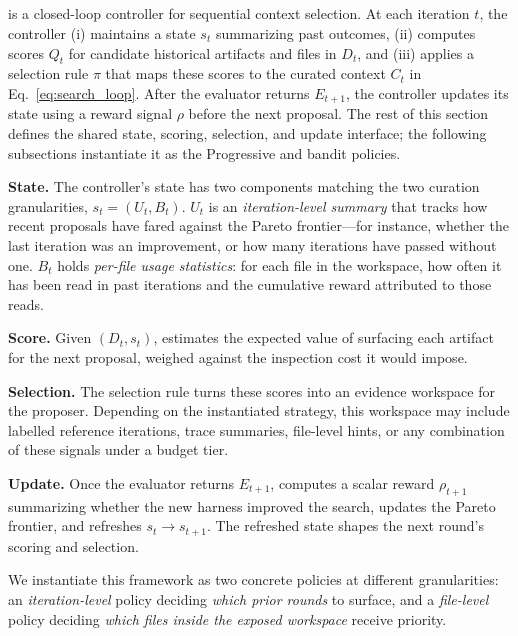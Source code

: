 \subsection{\name}
\name is a closed-loop controller for sequential context selection. At each iteration $t$, the controller (i) maintains a state $s_t$ summarizing past outcomes, (ii) computes scores $Q_t$ for candidate historical artifacts and files in $D_t$, and (iii) applies a selection rule $\pi$ that maps these scores to the curated context $C_t$ in Eq.~\ref{eq:search_loop}. After the evaluator returns $E_{t+1}$, the controller updates its state using a reward signal $\rho$ before the next proposal. The rest of this section defines the shared state, scoring, selection, and update interface; the following subsections instantiate it as the Progressive and bandit policies.

\textbf{State.} The controller's state has two components matching the two curation granularities, $s_t = (U_t, B_t)$. $U_t$ is an \emph{iteration-level summary} that tracks how recent proposals have fared against the Pareto frontier---for instance, whether the last iteration was an improvement, or how many iterations have passed without one. $B_t$ holds \emph{per-file usage statistics}: for each file in the workspace, how often it has been read in past iterations and the cumulative reward attributed to those reads.

\textbf{Score.} Given $(D_t, s_t)$, \name estimates the expected value of surfacing each artifact for the next proposal, weighed against the inspection cost it would impose.

\textbf{Selection.} The selection rule turns these scores into an evidence workspace for the proposer. Depending on the instantiated strategy, this workspace may include labelled reference iterations, trace summaries, file-level hints, or any combination of these signals under a budget tier.

\textbf{Update.}  Once the evaluator returns $E_{t+1}$, \name computes a scalar reward $\rho_{t+1}$ summarizing whether the new harness improved the search, updates the Pareto frontier, and refreshes $s_t \to s_{t+1}$. The refreshed state shapes the next round's scoring and selection.

We instantiate this framework as two concrete policies at different granularities: an
\emph{iteration-level} policy deciding \emph{which prior rounds} to surface, and a \emph{file-level} policy deciding \emph{which files inside the exposed workspace} receive priority.


